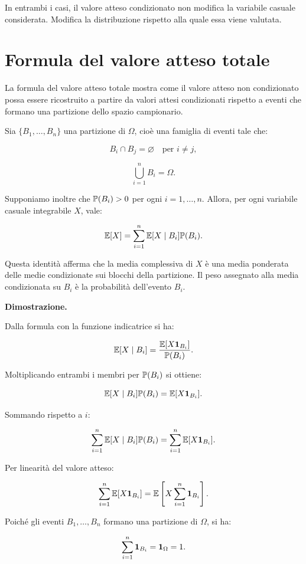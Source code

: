 In entrambi i casi, il valore atteso condizionato non modifica la variabile
casuale considerata. Modifica la distribuzione rispetto alla quale essa viene
valutata.

\section{Formula del valore atteso totale}

La formula del valore atteso totale mostra come il valore atteso non condizionato possa essere ricostruito a partire da valori attesi condizionati rispetto a eventi che formano una partizione dello spazio campionario.

Sia $\{B_1,\ldots,B_n\}$ una partizione di $\Omega$, cio\`{e} una famiglia di eventi tale che:

\[
B_i\cap B_j=\varnothing
\quad \text{per } i\neq j,
\]

\[
\bigcup_{i=1}^{n}B_i=\Omega.
\]

Supponiamo inoltre che $\mathbb{P}(B_i)>0$ per ogni $i=1,\ldots,n$. Allora, per ogni variabile casuale integrabile $X$, vale:

\[
\mathbb{E}[X]
=
\sum_{i=1}^{n}
\mathbb{E}[X\mid B_i]\mathbb{P}(B_i).
\]

Questa identit\`{a} afferma che la media complessiva di $X$ \`{e} una media ponderata delle medie condizionate sui blocchi della partizione. Il peso assegnato alla media condizionata su $B_i$ \`{e} la probabilit\`{a} dell'evento $B_i$.

\medskip

\noindent
\textbf{Dimostrazione.}

Dalla formula con la funzione indicatrice si ha:

\[
\mathbb{E}[X\mid B_i]
=
\frac{\mathbb{E}[X\mathbf{1}_{B_i}]}{\mathbb{P}(B_i)}.
\]

Moltiplicando entrambi i membri per $\mathbb{P}(B_i)$ si ottiene:

\[
\mathbb{E}[X\mid B_i]\mathbb{P}(B_i)
=
\mathbb{E}[X\mathbf{1}_{B_i}].
\]

Sommando rispetto a $i$:

\[
\sum_{i=1}^{n}
\mathbb{E}[X\mid B_i]\mathbb{P}(B_i)
=
\sum_{i=1}^{n}
\mathbb{E}[X\mathbf{1}_{B_i}].
\]

Per linearit\`{a} del valore atteso:

\[
\sum_{i=1}^{n}
\mathbb{E}[X\mathbf{1}_{B_i}]
=
\mathbb{E}\left[
X\sum_{i=1}^{n}\mathbf{1}_{B_i}
\right].
\]

Poich\'{e} gli eventi $B_1,\ldots,B_n$ formano una partizione di $\Omega$, si ha:

\[
\sum_{i=1}^{n}\mathbf{1}_{B_i}=\mathbf{1}_{\Omega}=1.
\]

